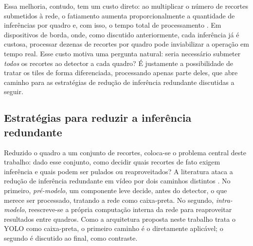\documentclass{ieeeaccess}
\begin{document}
Essa melhoria, contudo, tem um custo direto: ao multiplicar o número de recortes
submetidos à rede, o fatiamento aumenta proporcionalmente a quantidade de
inferências por quadro e, com isso, o tempo total de processamento
\cite{keles2022sliced}. Em dispositivos de borda, onde, como discutido
anteriormente, cada inferência já é custosa, processar dezenas de recortes por
quadro pode inviabilizar a operação em tempo real. Esse custo motiva uma pergunta
natural: seria necessário submeter \textit{todos} os recortes ao detector a cada
quadro? É justamente a possibilidade de tratar os tiles de forma diferenciada,
processando apenas parte deles, que abre caminho para as estratégias de
redução de inferência redundante discutidas a seguir.

\subsection{Estratégias para reduzir a inferência redundante}
\label{subsec:reducao_redundancia}

Reduzido o quadro a um conjunto de recortes, coloca-se o problema central deste
trabalho: dado esse conjunto, como decidir quais recortes de fato exigem
inferência e quais podem ser pulados ou reaproveitados? A literatura ataca a
redução de inferência redundante em vídeo por dois caminhos distintos
\cite{jiao2022vodsurvey}. No
primeiro, \textit{pré-modelo}, um componente leve decide, antes do detector, o
que merece ser processado, tratando a rede como caixa-preta. No segundo,
\textit{intra-modelo}, reescreve-se a própria computação interna da rede para
reaproveitar resultados entre quadros. Como a arquitetura proposta neste trabalho trata o YOLO
como caixa-preta, o primeiro caminho é o diretamente aplicável; o segundo é
discutido ao final, como contraste.
\end{document}
